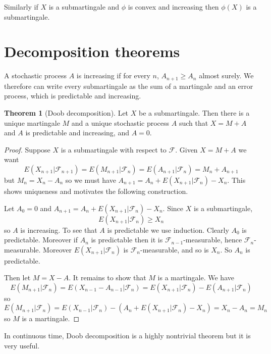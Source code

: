 \documentclass[12pt]{book}
\theoremstyle{definition}
\newtheorem{theorem}{Theorem}[chapter]
\begin{document}
Similarly if $X$ is a submartingale and $\phi$ is convex and increasing then $\phi(X)$ is a submartingale.

\section{Decomposition theorems}
A stochastic process $A$ is increasing if for every $n$, $A_{n+1} \geq A_n$ almost surely.
We therefore can write every submartingale as the sum of a martingale and an error process, which is predictable and increasing.

\begin{theorem}[Doob decomposition]
Let $X$ be a submartingale.
Then there is a unique martingale $M$ and a unique stochastic process $A$ such that $X = M + A$ and $A$ is predictable and increasing, and $A = 0$.
\end{theorem}
\begin{proof}
Suppose $X$ is a submartingale with respect to $\mathcal F$.
Given $X = M + A$ we want
$$E(X_{n+1}|\mathcal F_{n+1}) = E(M_{n+1}|\mathcal F_n) = E(A_{n+1}|\mathcal F_n) = M_n + A_{n+1}$$
but $M_n = X_n - A_n$ so we must have $A_{n+1} = A_n + E(X_{n+1}|\mathcal F_n) - X_n$.
This shows uniqueness and motivates the following construction.

Let $A_0 = 0$ and $A_{n+1} = A_n + E(X_{n+1}|\mathcal F_n) - X_n$.
Since $X$ is a submartingale,
$$E(X_{n+1}|\mathcal F_n) \geq X_n$$
so $A$ is increasing. To see that $A$ is predictable we use induction. Clearly $A_0$ is predictable. Moreover if $A_n$ is predictable then it is $\mathcal F_{n-1}$-measurable, hence $\mathcal F_n$-measurable.
Moreover $E(X_{n+1}|\mathcal F_n)$ is $\mathcal F_n$-measurable, and so is $X_n$.
So $A_n$ is predictable.

Then let $M = X - A$. It remains to show that $M$ is a martingale.
We have
$$E(M_{n+1}|\mathcal F_n) = E(X_{n-1} - A_{n-1}|\mathcal F_n) = E(X_{n+1}|\mathcal F_n) - E(A_{n+1}|\mathcal F_n)$$
so
$$E(M_{n+1}|\mathcal F_n) = E(X_{n-1}|\mathcal F_n) - (A_n + E(X_{n+1}|\mathcal F_n) - X_n) = X_n - A_n = M_n$$
so $M$ is a martingale.
\end{proof}

In continuous time, Doob decomposition is a highly nontrivial theorem but it is very useful.
\end{document}

